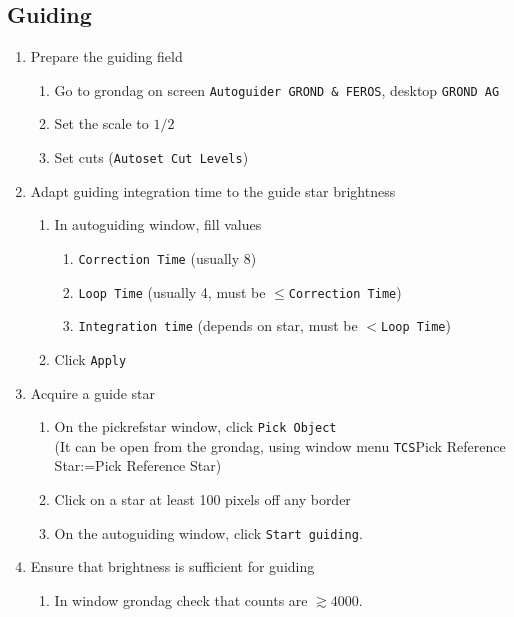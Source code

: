 \documentclass[11pt,fleqn,a4paper]{book}
\makeatletter
\def\menu#1#2{\texttt{#1}\ifx{}#2\else\@for\@x:=#2\do{$\rightarrow$\texttt{\@x}}\fi}
\def\wmenu#1#2{window menu \menu{#1}{#2}}
\makeatother
\begin{document}
\subsection{Guiding}
\label{sec:grond:guide}
\label{proc:guidegrond}
\begin{enumerate}
    \item Prepare the guiding field
    \begin{enumerate} 
        \item Go to \gls{grondag} on screen \texttt{Autoguider GROND \& FEROS}, \gls{desktop} \texttt{GROND AG}
        \item Set the scale to $1/2$
        \item Set cuts (\texttt{Autoset Cut Levels})
    \end{enumerate}
    \item\label{list:agcontrolgrond} Adapt guiding integration time to the guide star brightness
    \begin{enumerate}
        \item In \gls{autoguiding} window, fill values
            \begin{enumerate}
                \item \texttt{Correction Time} (usually 8)
                \item \texttt{Loop Time} (usually 4, must be $\le $\texttt{Correction Time})
                \item \texttt{Integration time} (depends on star, must be $< $\texttt{Loop Time})
            \end{enumerate}
        \item Click \texttt{Apply}
    \end{enumerate}
    \item Acquire a guide star
    \begin{enumerate}
        \item On the \gls{pickrefstar} window, click \texttt{Pick Object}\\
        (It can be open from the \gls{grondag}, using \wmenu{TCS}{Pick Reference Star}) 
        \item Click on a star at least 100 pixels off any border
        \item On the \gls{autoguiding} window, click \texttt{Start guiding}.
    \end{enumerate}
    \item Ensure that brightness is sufficient for guiding
    \begin{enumerate}
        \item In window \gls{grondag} check that counts are $\gtrsim 4000$.

\end{enumerate}
\end{enumerate}
\end{document}

